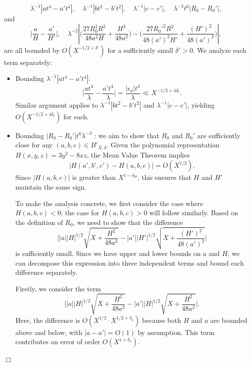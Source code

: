 \documentclass{article}
\newenvironment{proof}{\noindent {\bf Proof:}}{$\Box$ \vspace{2 ex}}
\begin{document}
\begin{proof}
\begin{equation*}
 \lambda^{-1}|a t^4 - a' t^4|, \quad \lambda^{-1}| b t^2 -b' t^2|, \quad \lambda^{-1}|c-c'|, \quad  \lambda^{-3}t^6|R_0-R_0' |,
\end{equation*}
and 
\begin{equation*}
\Big| \frac{ a }{H } - \frac{a' }{H' } \Big|, \quad 
\lambda^{-2}\left|\Big(\frac{27 R_0^2R^2}{48 a^2 H} + \frac{H^2}{48 a^2}\Big)-\Big(\frac{27 R_0'^2R^2}{48 (a')^2 H'} + \frac{(H')^2}{48 (a')^2}\Big) \right|,
\end{equation*}
are all bounded by $O(X^{-1/2 + \delta'})$ for a sufficiently small $\delta' > 0$. We analyze each term separately:

\begin{itemize}
    \item Bounding $\lambda^{-1}|a t^4 - a' t^4|$:
    \begin{equation*}
    \Big| \frac{a t^4}{\lambda} - \frac{a' t^4}{\lambda} \Big| = \frac{|\epsilon_a| t^4}{\lambda} \ll X^{-1/2 + 4\delta_t}.
    \end{equation*}
Similar argument applies to $\lambda^{-1}| b t^2 -b' t^2|$ and $\lambda^{-1}|c-c'|$, yielding $O(X^{-1/2 + 4\delta_t})$ for each.

\item Bounding $|R_0-R_0'|t^6\lambda^{-3}$ :
we aim to show that $R_0$ and $R_0'$ are sufficiently close for any $(a, b, c) \in B'_{X, \delta}$. Given the polynomial representation \( H(x,y,z) = 3y^2 - 8xz \), the Mean Value Theorem implies
\begin{equation*}
|H(a', b', c') - H(a, b, c)| = O(X^{1/2}).
\end{equation*}
Since $|H(a, b, c)|$ is greater than $X^{1 - \delta_H}$, this ensures that $H$ and $H'$ maintain the same sign.

To make the analysis concrete, we first consider the case where \( H(a, b, c) < 0 \); the case for \( H(a, b, c) > 0 \) will follow similarly. Based on the definition of \( R_0 \), we need to show that the difference
\begin{equation*}
\Big| |a| |H|^{1/2} \sqrt{X + \frac{H^2}{48a^2}} - |a'| |H'|^{1/2} \sqrt{X + \frac{(H')^2}{48(a')^2}} \Big|
\end{equation*}
is sufficiently small. Since we have upper and lower bounds on $a$ and $H$, we can decompose this expression into three independent terms and bound each difference separately.

Firstly, we consider the term
\begin{equation*}
\Big| |a| |H|^{1/2} \sqrt{X + \frac{H^2}{48a^2}} - |a'| |H|^{1/2} \sqrt{X + \frac{H^2}{48a^2}} \Big|.
\end{equation*}
Here, the difference is $O(X^{1/2} \cdot X^{1/2 + \delta_a})$ because both $H$ and $a$ are bounded above and below, with $|a - a'| = O(1)$ by assumption. This term contributes an error of order $O(X^{1 + \delta_a})$.


\end{itemize}
\end{proof}
\end{document}
